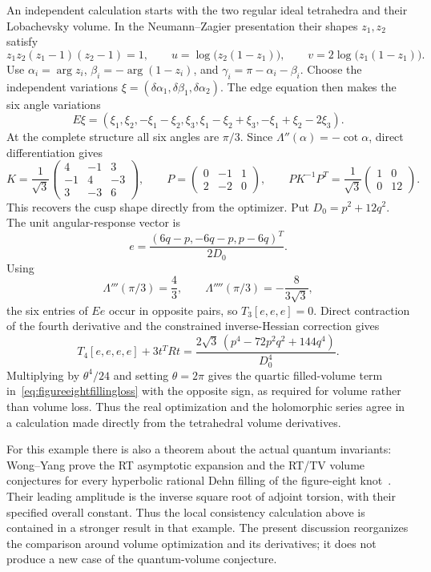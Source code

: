 \documentclass[11pt,a4paper]{article}
\numberwithin{equation}{section}
\theoremstyle{definition}
\theoremstyle{remark}
\begin{document}
An independent calculation starts with the two regular ideal tetrahedra
and their Lobachevsky volume. In the Neumann--Zagier presentation their
shapes $z_1,z_2$ satisfy
\[
 z_1z_2(z_1-1)(z_2-1)=1,\qquad
 u=\log\bigl(z_2(1-z_1)\bigr),\qquad
 v=2\log\bigl(z_1(1-z_1)\bigr).
\]
Use $\alpha_i=\arg z_i$, $\beta_i=-\arg(1-z_i)$, and
$\gamma_i=\pi-\alpha_i-\beta_i$. Choose the independent variations
$\xi=(\delta\alpha_1,\delta\beta_1,\delta\alpha_2)$.
The edge equation then makes the six angle variations
\[
 E\xi=(\xi_1,\xi_2,-\xi_1-\xi_2,
       \xi_3,\xi_1-\xi_2+\xi_3,-\xi_1+\xi_2-2\xi_3).
\]
At the complete structure all six angles are $\pi/3$.
Since $\Lambda''(\alpha)=-\cot\alpha$, direct differentiation gives
\begin{equation}
 K=\frac1{\sqrt3}
 \begin{pmatrix}4&-1&3\\-1&4&-3\\3&-3&6\end{pmatrix},\qquad
 P=\begin{pmatrix}0&-1&1\\2&-2&0\end{pmatrix},\qquad
 P K^{-1}P^T=\frac1{\sqrt3}
 \begin{pmatrix}1&0\\0&12\end{pmatrix}.
 \label{eq:figureeightdirectHessian}
\end{equation}
This recovers the cusp shape directly from the optimizer.
Put $D_0=p^2+12q^2$. The unit angular-response vector is
\[
 e=\frac{(6q-p,-6q-p,p-6q)^T}{2D_0}.
\]
Using
\[
 \Lambda'''(\pi/3)=\frac43,\qquad
 \Lambda''''(\pi/3)=-\frac8{3\sqrt3},
\]
the six entries of $Ee$ occur in opposite pairs, so
$T_3[e,e,e]=0$. Direct contraction of the fourth derivative and
the constrained inverse-Hessian correction gives
\begin{equation}
 T_4[e,e,e,e]+3t^TRt
   =\frac{2\sqrt3\,(p^4-72p^2q^2+144q^4)}{D_0^4}.
 \label{eq:figureeightdirectquartic}
\end{equation}
Multiplying by $\theta^4/24$ and setting $\theta=2\pi$ gives
the quartic filled-volume term in~\eqref{eq:figureeightfillingloss}
with the opposite sign, as required for volume rather than volume loss.
Thus the real optimization and the holomorphic series agree in a
calculation made directly from the tetrahedral volume derivatives.

For this example there is also a theorem about the actual quantum
invariants: Wong--Yang prove the RT asymptotic expansion and the
RT/TV volume conjectures for every hyperbolic rational Dehn filling
of the figure-eight knot~\cite[Theorems 1.1 and 1.2]{WongYangDehn}.
Their leading amplitude is the inverse square root of adjoint torsion,
with their specified overall constant. Thus the local consistency
calculation above is contained in a stronger result in that example.
The present discussion reorganizes the comparison around volume
optimization and its derivatives; it does not produce a new case
of the quantum-volume conjecture.
\end{document}
